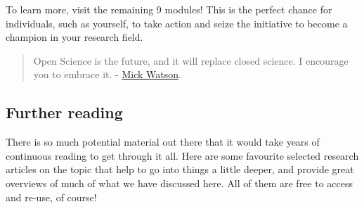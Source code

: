 \documentclass[]{book}
\begin{document}
To learn more, visit the remaining 9 modules! This is the perfect chance for individuals, such as yourself, to take action and seize the initiative to become a champion in your research field.

\begin{quote}
Open Science is the future, and it will replace closed science. I encourage you to embrace it. - \href{(https://github.com/OpenScienceMOOC/Module-1-Open-Principles/blob/master/Reading\%20Material_Open\%20Principles/Watson\%2C\%202015.pdf)}{Mick Watson}.
\end{quote}

\hypertarget{further-reading}{%
\subsection{Further reading }\label{further-reading}}

There is so much potential material out there that it would take years of continuous reading to get through it all. Here are some favourite selected research articles on the topic that help to go into things a little deeper, and provide great overviews of much of what we have discussed here. All of them are free to access and re-use, of course!
\end{document}
